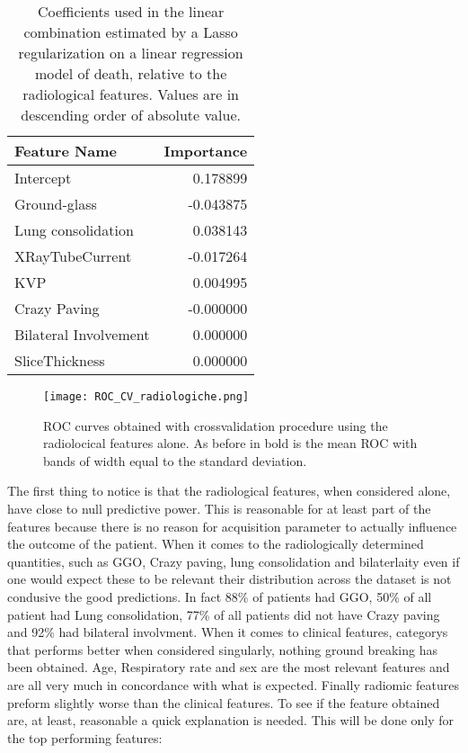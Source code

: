 \begin{table}
	\caption{Coefficients used in the linear combination estimated by a Lasso regularization on a linear regression model of death, relative to the radiological features. Values are in descending order of absolute value. \label{tab:ParamRadiologiche}}
		\centering
			\begin{tabular}{lr}
			\toprule
			Feature Name &  Importance \\
			\midrule
			Intercept             &                      0.178899 \\
			Ground-glass          &                     -0.043875 \\
			Lung consolidation    &                      0.038143 \\
			XRayTubeCurrent       &                     -0.017264 \\
			KVP                   &                      0.004995 \\
			Crazy Paving          &                     -0.000000 \\
			Bilateral Involvement &                      0.000000 \\
			SliceThickness        &                      0.000000 \\
			\bottomrule
			\end{tabular}
\end{table}

\begin{figure}[htbp]
	\centering
  		\texttt{[image: ROC\_CV\_radiologiche.png]}
        \caption{ROC curves obtained with crossvalidation procedure using the radiolocical features alone. As before  in bold is the mean ROC with bands of width equal to the standard deviation.\label{fig:RocDeathRadiologiche}}
\end{figure}

The first thing to notice is that the radiological features, when considered alone, have close to null predictive power. This is reasonable for at least part of the features because there is no reason for acquisition parameter to actually influence the outcome of the patient.  When it comes to the radiologically determined quantities, such as GGO, Crazy paving, lung consolidation and bilaterlaity even if one would expect these to be relevant their distribution across the dataset is not condusive the good predictions. In fact 88\% of patients had GGO, 50\% of all patient had Lung consolidation, 77\% of all patients did not have Crazy paving and 92\% had bilateral involvment. When it comes to clinical features, categorys that performs better when considered singularly, nothing ground breaking has been obtained. Age, Respiratory rate and sex are the most relevant features and are all very much in concordance with what is expected. Finally radiomic features preform slightly worse than the clinical features. To see if the feature obtained are, at least, reasonable a quick explanation is needed. This will be done only for the top performing features:

